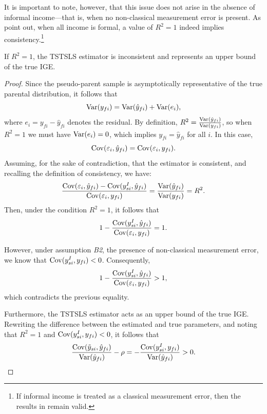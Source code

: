 It is important to note, however, that this issue does not arise in the absence of informal income—that is, when no non-classical measurement error is present. As \textcite{CortesOrihuela_2025} point out, when all income is formal, a value of $R^2 = 1$ indeed implies consistency.\footnote{If informal income is treated as a classical measurement error, then the results in \textcite{CortesOrihuela_2025} remain valid.}

\begin{proposition}
If $R^2 = 1$, the TSTSLS estimator is inconsistent and represents an upper bound of the true IGE.
\end{proposition}

\begin{proof}
Since the pseudo-parent sample is asymptotically representative of the true parental distribution, it follows that
\[
\operatorname{Var}(y_{fi}) = \operatorname{Var}(\hat{y}_{fi}) + \operatorname{Var}(e_i),
\]
where $e_i = y_{fi} - \hat{y}_{fi}$ denotes the residual.  
By definition, $R^2 = \frac{\operatorname{Var}(\hat{y}_{fi})}{\operatorname{Var}(y_{fi})}$, so when $R^2 = 1$ we must have $\operatorname{Var}(e_i) = 0$, which implies $y_{fi} = \hat{y}_{fi}$ for all $i$. In this case,
\[
\operatorname{Cov}(\varepsilon_i, \hat{y}_{fi}) = \operatorname{Cov}(\varepsilon_i, y_{fi}).
\]
Assuming, for the sake of contradiction, that the estimator is consistent, and recalling the definition of consistency, we have:
\[
\frac{\operatorname{Cov}(\varepsilon_i, \hat{y}_{fi}) - \operatorname{Cov}(y_{si}^I, \hat{y}_{fi})}{\operatorname{Cov}(\varepsilon_i, y_{fi})} 
= \frac{\operatorname{Var}(\hat{y}_{fi})}{\operatorname{Var}(y_{fi})} = R^2.
\]
Then, under the condition $R^2 = 1$, it follows that
\[
1 - \frac{\operatorname{Cov}(y_{si}^I, \hat{y}_{fi})}{\operatorname{Cov}(\varepsilon_i, y_{fi})} = 1.
\]

However, under assumption \emph{B2}, the presence of non-classical measurement error, we know that $\operatorname{Cov}(y_{si}^I, y_{fi}) < 0$. Consequently,
\[
1 - \frac{\operatorname{Cov}(y_{si}^I, \hat{y}_{fi})}{\operatorname{Cov}(\varepsilon_i, y_{fi})} > 1,
\]
which contradicts the previous equality.

Furthermore, the TSTSLS estimator acts as an upper bound of the true IGE. Rewriting the difference between the estimated and true parameters, and noting that $R^2 = 1$ and $\operatorname{Cov}(y_{si}^I, y_{fi}) < 0$, it follows that
\[
\frac{\operatorname{Cov}(\tilde y_{si}, \hat{y}_{fi})}{\operatorname{Var}(\hat{y}_{fi})} - \rho = -\frac{\operatorname{Cov}(y_{si}^I, y_{fi})}{\operatorname{Var}(\hat{y}_{fi})} > 0.
\]

\end{proof}





